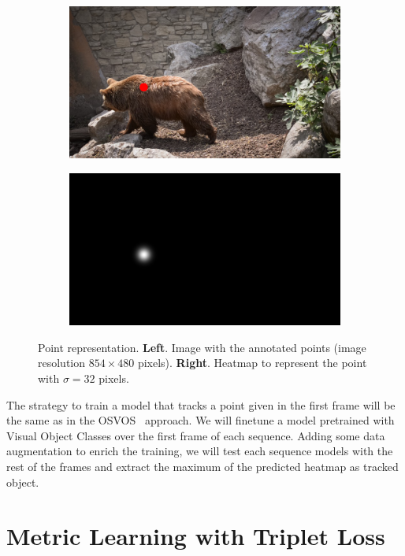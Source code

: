 \begin{figure}[h]
  \centering
  \begin{subfigure}{.5\textwidth}
    \centering
    \includegraphics[width=.8\linewidth]{figures/methods/heatmaps/image_point.png}
  \end{subfigure}%
  \begin{subfigure}{.5\textwidth}
    \centering
    \includegraphics[width=.8\linewidth]{figures/methods/heatmaps/heatmap.png}
  \end{subfigure}
  \caption{
  Point representation.
  \textbf{Left}. Image with the annotated points (image resolution $854 \times 480$ pixels).
  \textbf{Right}. Heatmap to represent the point with $\sigma = 32$ pixels. }
  \label{fig:point_representation}
\end{figure}

The strategy to train a model that tracks a point given in the first frame will be the same as in the OSVOS~\cite{caelles2017one} approach.
We will finetune a model pretrained with Visual Object Classes over the first frame of each sequence.
Adding some data augmentation to enrich the training, we will test each sequence models with the rest of the frames and extract the maximum of the predicted heatmap as tracked object.

\section{Metric Learning with Triplet Loss}
\label{sec:methods_metriclearning}


